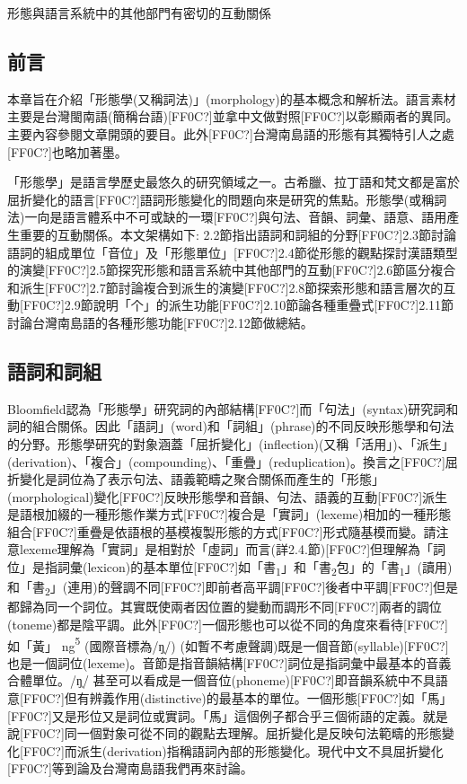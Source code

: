 \rmfamily
形態與語言系統中的其他部門有密切的互動關係

\subsection{ 前言}

\textrm{本章旨在介紹「形態學(又稱詞法)」(morphology)的基本概念和解析法}。\textrm{語言素材主要是台灣閩南語(簡稱台語)}[FF0C?]\textrm{並拿中文做對照[FF0C?]以彰顯兩者的異同}。\textrm{主要內容參閱文章開頭的要目}。\textrm{此外}[FF0C?]\textrm{台灣南島語的形態有其獨特引人之處}[FF0C?]\textrm{也略加著墨。}

\textrm{「形態學」是語言學歷史最悠久的研究領域之一。古希臘、拉丁語和梵文都是富於屈折變化的語言[FF0C?]語詞形態變化的問題向來是研究的焦點。形態學(或稱詞法)一向是語言體系中不可或缺的一環[FF0C?]與句法、音韻、詞彙、語意、語用產生重要的互動關係。本文架構如下: 2.2節指出語詞和詞組的分野[FF0C?]2.3節討論語詞的組成單位「音位」及「形態單位」[FF0C?]2.4節從形態的觀點探討漢語類型的演變[FF0C?]2.5節探究形態和語言系統中其他部門的互動[FF0C?]2.6節區分複合和派生[FF0C?]2.7節討論複合到派生的演變[FF0C?]2.8節探索形態和語言層次的互動[FF0C?]2.9節說明「个」的派生功能[FF0C?]2.10節論各種重疊式[FF0C?]2.11節討論台灣南島語的各種形態功能[FF0C?]2.12節做總結。}

\subsection{ 語詞和詞組}

\textrm{Bloomfield認為「形態學」研究詞的內部結構[FF0C?]而「句法」(syntax)研究詞和詞的組合關係。因此「語詞」(word)和「詞組」(phrase)的不同反映形態學和句法的分野。形態學研究的對象涵蓋「屈折變化」(inflection)(又稱「活用」)、「派生」(derivation)、「複合」(compounding)、「重疊」(reduplication)。換言之[FF0C?]屈折變化是詞位為了表示句法、語義範疇之聚合關係而產生的「形態」(morphological)變化[FF0C?]反映形態學和音韻、句法、語義的互動[FF0C?]派生是語根加綴的一種形態作業方式[FF0C?]複合是「實詞」(lexeme)相加的一種形態組合[FF0C?]重疊是依語根的基模複製形態的方式[FF0C?]形式隨基模而變。請注意lexeme理解為「實詞」是相對於「虛詞」而言(詳2.4.節)[FF0C?]但理解為「詞位」是指詞彙(lexicon)的基本單位[FF0C?]如「書}\textrm{\textsubscript{1}}\textrm{」和「書}\textrm{\textsubscript{2}}\textrm{包」的「書}\textrm{\textsubscript{1}}\textrm{」(讀用)和「書}\textrm{\textsubscript{2}}\textrm{」(連用)的聲調不同[FF0C?]即前者高平調[FF0C?]後者中平調[FF0C?]但是都歸為同一个詞位。其實既使兩者因位置的變動而調形不同[FF0C?]兩者的調位(toneme)都是陰平調。此外[FF0C?]一個形態也可以從不同的角度來看待[FF0C?]如「黃」 ng}\textrm{\textsuperscript{5}} \textrm{(國際音標為/ŋ̩/) (如暫不考慮聲調)既是一個音節(syllable)[FF0C?]也是一個詞位(lexeme)}。\textrm{音節是指音韻結構}[FF0C?]\textrm{詞位是指詞彙中最基本的音義合體單位}。\textrm{/ŋ̩/ 甚至可以看成是一個音位(phoneme)}[FF0C?]\textrm{即音韻系統中不具語意}[FF0C?]\textrm{但有辨義作用(distinctive)的最基本的單位}。\textrm{一個形態[FF0C?]如「馬」}[FF0C?]\textrm{又是形位又是詞位或實詞}。\textrm{「馬」這個例子都合乎三個術語的定義}。\textrm{就是說}[FF0C?]\textrm{同一個對象可從不同的觀點去理解}。\textrm{屈折變化是反映句法範疇的形態變化}[FF0C?]\textrm{而派生(derivation)指稱語詞內部的形態變化}。\textrm{現代中文不具屈折變化}[FF0C?]\textrm{等到論及台灣南島語我們再來討論}。

